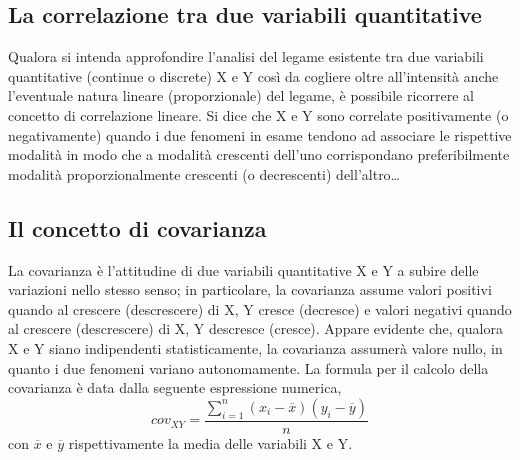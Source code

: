 \subsection{La correlazione tra due variabili quantitative} 
\label{subsec:stat02_correlazione}

Qualora si intenda approfondire l'analisi del legame esistente tra due 
variabili quantitative (continue o discrete) X e Y così da cogliere oltre 
all'intensità anche l'eventuale natura lineare (proporzionale) del legame, 
è possibile ricorrere al concetto di correlazione lineare. Si dice che X e 
Y sono correlate positivamente (o negativamente) quando i due fenomeni in 
esame tendono ad associare le rispettive modalità in modo che a modalità 
crescenti dell'uno corrispondano preferibilmente modalità proporzionalmente 
crescenti (o decrescenti) dell'altro\dots 

\subsection{Il concetto di covarianza}
\label{subsec:stat02_covarianza}

La covarianza è l'attitudine di due variabili quantitative X e Y a subire 
delle variazioni nello stesso senso; in particolare, la covarianza assume 
valori positivi quando al crescere (descrescere) di X, Y cresce (decresce) 
e valori negativi quando al crescere (descrescere) di X, Y descresce 
(cresce). Appare evidente che, qualora X e Y siano indipendenti 
statisticamente, la covarianza assumerà valore nullo, in quanto i due 
fenomeni variano autonomamente. 
La formula per il calcolo della covarianza è data dalla seguente  
espressione numerica,
\[cov_{XY}=\frac{\sum_{i=1}^{n}(x_i-\overline{x})(y_i-\overline{y})}{n}\]
con \(\overline{x}\) e \(\overline{y}\) rispettivamente la media delle 
variabili X e Y.

